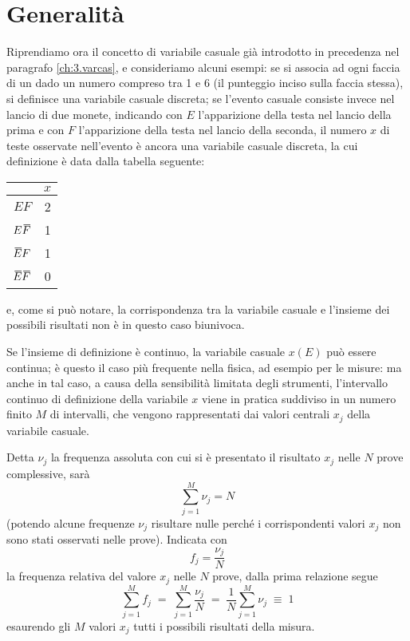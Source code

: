 \section{Generalit\`a}%
Riprendiamo ora il concetto di variabile casuale gi\`a
introdotto in precedenza nel paragrafo \ref{ch:3.varcas}, e
consideriamo alcuni esempi: se si associa ad ogni faccia di
un dado un numero compreso tra 1 e 6 (il punteggio inciso
sulla faccia stessa), si definisce una variabile casuale
discreta; se l'evento casuale consiste invece nel lancio di
due monete, indicando con $E$ l'apparizione della testa nel
lancio della prima e con $F$ l'apparizione della testa nel
lancio della seconda, il numero $x$ di teste osservate
nell'evento \`e ancora una variabile casuale discreta, la
cui definizione \`e data dalla tabella seguente: \medskip
\begin{center}
  \begin{tabular}{rc}
     & $x$ \\
    \midrule
    $EF$ & 2 \\
    $E \ob{F}$ & 1 \\
    $\ob{E} F$ & 1 \\
    $\ob{E} \ob{F}$ & 0 \\
    \bottomrule
  \end{tabular}
\end{center}
\medskip e, come si pu\`o notare, la corrispondenza tra la
variabile casuale e l'insieme dei possibili risultati non
\`e in questo caso biunivoca.

Se l'insieme di definizione \`e continuo, la variabile
casuale $x(E)$ pu\`o essere continua; \`e questo il caso
pi\`u frequente nella fisica, ad esempio per le misure: ma
anche in tal caso, a causa della sensibilit\`a limitata
degli strumenti, l'intervallo continuo di definizione della
variabile $x$ viene in pratica suddiviso in un numero finito
$M$ di intervalli, che vengono rappresentati dai valori
centrali $x_j$ della variabile casuale.%

Detta $\nu_j$ la frequenza assoluta con cui si \`e
presentato il risultato $x_{j}$ nelle $N$ prove complessive,
sar\`a
\begin{equation*}
  \sum_{j=1}^M \nu_j = N
\end{equation*}
(potendo alcune frequenze $\nu_j$ risultare nulle perch\'e i
corrispondenti valori $x_j$ non sono stati osservati nelle
prove).  Indicata con
\begin{equation*}
  f_j = \frac{\nu_j}{N}
\end{equation*}
la frequenza relativa del valore $x_j$ nelle $N$ prove,
dalla prima relazione segue
\begin{equation*}
  \sum_{j=1}^M f_j \; = \; \sum_{j=1}^M
  \frac{\nu_j}{N} \; = \;
  \frac{1}{N} \sum_{j=1}^M \nu_j \; \equiv \; 1
\end{equation*}
esaurendo gli $M$ valori $x_j$ tutti i possibili risultati
della misura.

